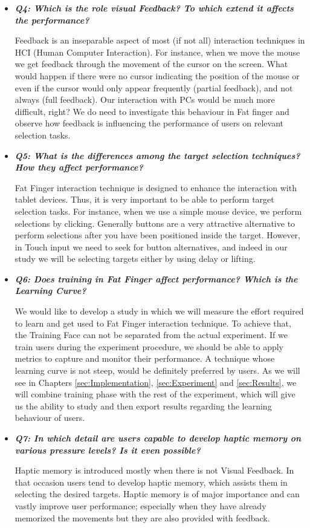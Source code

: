 \begin{itemize}
    \item \emph{\textbf{Q4: Which is the role visual Feedback? To which extend it affects the performance?}}

    Feedback is an inseparable aspect of most (if not all) interaction techniques in HCI (Human Computer Interaction). For instance, when we move the mouse we get feedback through the movement of the cursor on the screen. What would happen if there were no cursor indicating the position of the mouse or even if the cursor would only appear frequently (partial feedback), and not always (full feedback). Our interaction with PCs would be much more difficult, right?
    We do need to investigate this behaviour in Fat finger and observe how feedback is influencing the performance of users on relevant selection tasks.


    \item \emph{\textbf{Q5: What is the differences among the target selection techniques? How they affect performance?}}

    Fat Finger interaction technique is designed to enhance the interaction with tablet devices. Thus, it is very important to be able to perform target selection tasks. For instance, when we use a simple mouse device, we perform selections by clicking. Generally buttons are a very attractive alternative to perform selections after you have been positioned inside the target. However, in Touch input we need to seek for button alternatives, and indeed in our study we will be selecting targets either by using delay or lifting.


    \item \emph{\textbf{Q6: Does training in Fat Finger affect performance? Which is the Learning Curve?}}

    We would like to develop a study in which we will measure the effort required to learn and get used to Fat Finger interaction technique.
    To achieve that, the Training Face can not be separated from the actual experiment. If we train users during the experiment procedure, we should be able to apply metrics to capture and monitor their performance.
    A technique whose learning curve is not steep, would be definitely preferred by users. As we will see in Chapters \ref{sec:Implementation}, \ref{sec:Experiment} and \ref{sec:Results}, we will combine training phase with the rest of the experiment, which will give us the ability to study and then export results regarding the learning behaviour of users.

    \item \emph{\textbf{Q7: In which detail are users capable to develop haptic memory on various pressure levels? Is it even possible?}}

    Haptic memory is introduced mostly when there is not Visual Feedback. In that occasion users tend to develop haptic memory, which assists them in selecting the desired targets. Haptic memory is of major importance and can vastly improve user performance; especially when they have already memorized the movements but they are also provided with feedback.  

\end{itemize}

